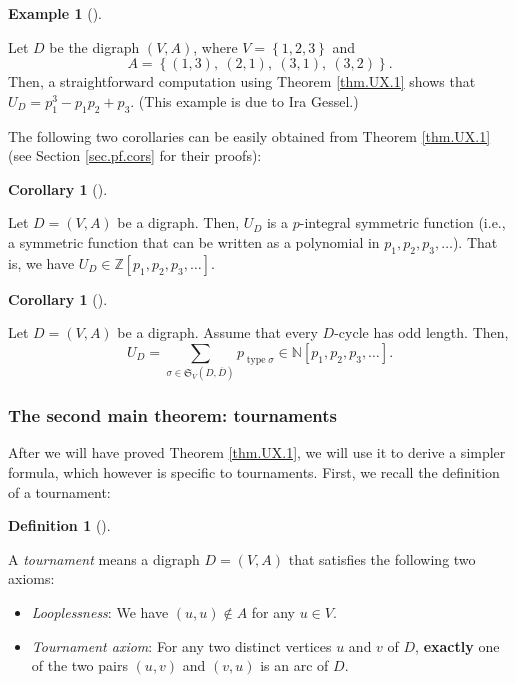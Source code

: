 \documentclass[numbers=enddot,12pt,final,onecolumn,notitlepage]{scrartcl}%
\numberwithin{exer}{section}
\theoremstyle{definition}
\newtheorem{defi}[theo]{Definition}
\newenvironment{definition}[1][]
{\begin{defi}[#1]\begin{leftbar}}
{\end{leftbar}\end{defi}}
\newtheorem{coro}[theo]{Corollary}
\newenvironment{corollary}[1][]
{\begin{coro}[#1]\begin{leftbar}}
{\end{leftbar}\end{coro}}
\newtheorem{exam}[theo]{Example}
\newenvironment{example}[1][]
{\begin{exam}[#1]\begin{leftbar}}
{\end{leftbar}\end{exam}}
\let\sumnonlimits\sum
\renewcommand{\sum}{\sumnonlimits\limits}
\begin{document}
\begin{example}
Let $D$ be the digraph $\left(  V,A\right)  $, where $V=\left\{
1,2,3\right\}  $ and
\[
A=\left\{  \left(  1,3\right)  ,\ \left(  2,1\right)  ,\ \left(  3,1\right)
,\ \left(  3,2\right)  \right\}  .
\]
Then, a straightforward computation using Theorem \ref{thm.UX.1} shows that
$U_{D}=p_{1}^{3}-p_{1}p_{2}+p_{3}$. (This example is due to Ira Gessel.)
\end{example}

The following two corollaries can be easily obtained from Theorem
\ref{thm.UX.1} (see Section \ref{sec.pf.cors} for their proofs):

\begin{corollary}
\label{cor.UX.p-int}Let $D=\left(  V,A\right)  $ be a digraph. Then, $U_{D}$
is a $p$-integral symmetric function (i.e., a symmetric function that can be
written as a polynomial in $p_{1},p_{2},p_{3},\ldots$). That is, we have
$U_{D}\in\mathbb{Z}\left[  p_{1},p_{2},p_{3},\ldots\right]  $.
\end{corollary}

\begin{corollary}
\label{cor.UX.if-each-D-cyc-odd}Let $D=\left(  V,A\right)  $ be a digraph.
Assume that every $D$-cycle has odd length. Then,
\[
U_{D}=\sum_{\sigma\in\mathfrak{S}_{V}\left(  D,\overline{D}\right)
}p_{\operatorname*{type}\sigma}\in\mathbb{N}\left[  p_{1},p_{2},p_{3}%
,\ldots\right]  .
\]

\end{corollary}

\subsubsection{The second main theorem: tournaments}

After we will have proved Theorem \ref{thm.UX.1}, we will use it to derive a
simpler formula, which however is specific to tournaments. First, we recall
the definition of a tournament:

\begin{definition}
A \emph{tournament} means a digraph $D=\left(  V,A\right)  $ that satisfies
the following two axioms:

\begin{itemize}
\item \emph{Looplessness}: We have $\left(  u,u\right)  \notin A$ for any
$u\in V$.

\item \emph{Tournament axiom}: For any two distinct vertices $u$ and $v$ of
$D$, \textbf{exactly} one of the two pairs $\left(  u,v\right)  $ and $\left(
v,u\right)  $ is an arc of $D$.
\end{itemize}
\end{definition}
\end{document}
